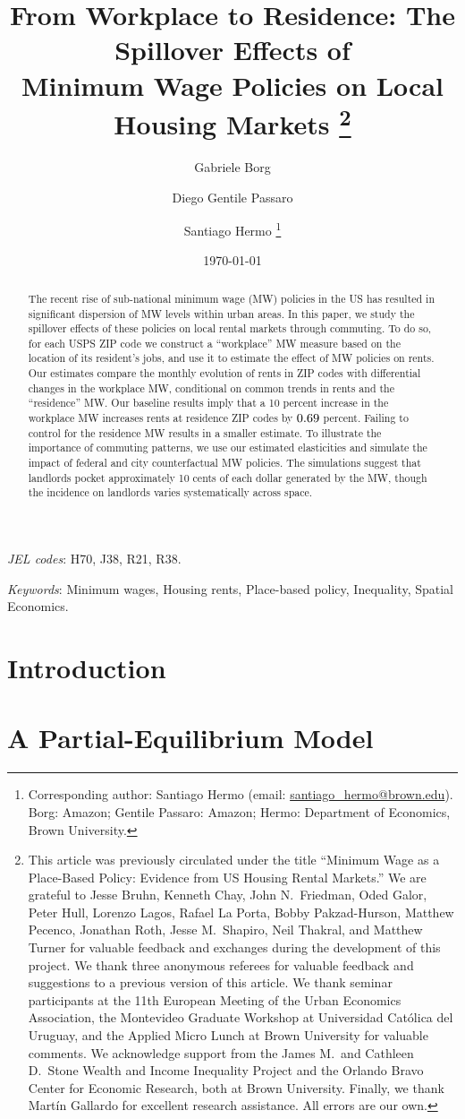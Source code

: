 \documentclass{article}
\title{ From Workplace to Residence: The Spillover Effects of \\
        Minimum Wage Policies on Local Housing Markets%
        \thanks{This article was previously circulated under the title
        ``Minimum Wage as a Place-Based Policy: Evidence from US Housing Rental 
        Markets.''
        We are grateful to Jesse Bruhn, Kenneth Chay, John N.\ Friedman, 
        Oded Galor, Peter Hull, Lorenzo Lagos, Rafael La Porta, Bobby Pakzad-Hurson, 
        Matthew Pecenco, Jonathan Roth, Jesse M.\ Shapiro, Neil Thakral, 
        and Matthew Turner for valuable feedback and exchanges during the 
        development of this project.
        We thank three anonymous referees for valuable feedback and suggestions
        to a previous version of this article.
        We thank seminar participants at 
        the 11th European Meeting of the Urban Economics Association, 
        the Montevideo Graduate Workshop at Universidad Católica del Uruguay, and
        the Applied Micro Lunch at Brown University for valuable comments.
        We acknowledge support from 
        the James M.\ and Cathleen D.\ Stone Wealth and Income Inequality Project and 
        the Orlando Bravo Center for Economic Research, both at Brown University.
        Finally, we thank Martín Gallardo for excellent research assistance.
        All errors are our own.}}
\author{Gabriele Borg \and Diego Gentile Passaro \and Santiago Hermo%
        \footnote{Corresponding author: Santiago Hermo (email: \url{santiago_hermo@brown.edu}).
        Borg: Amazon;
        Gentile Passaro: Amazon;
        Hermo: Department of Economics, Brown University.}}
\date{\today}
\begin{document}

\maketitle

\begin{abstract}
    \noindent
    The recent rise of sub-national minimum wage (MW) policies in the US has 
    resulted in significant dispersion of MW levels within urban areas.
    In this paper, we study the spillover effects of these policies on local
    rental markets through commuting.
    To do so, for each USPS ZIP code we construct a ``workplace'' MW measure 
    based on the location of its resident's jobs, and use it to estimate the 
    effect of MW policies on rents.
    Our estimates compare the monthly evolution of rents in ZIP codes with 
    differential changes in the workplace MW, conditional on common trends 
    in rents and the ``residence'' MW.
    Our baseline results imply that a 10 percent increase in the workplace MW 
    increases rents at residence ZIP codes by $0.69$ percent.
    Failing to control for the residence MW results in a smaller estimate.
    To illustrate the importance of commuting patterns, we use our estimated 
    elasticities and simulate the impact of federal and city counterfactual 
    MW policies.
    The simulations suggest that landlords pocket approximately 10 cents of each 
    dollar generated by the MW, though the incidence on landlords varies 
    systematically across space.
\end{abstract}

\noindent \textit{JEL codes}: H70, J38, R21, R38.

\noindent \textit{Keywords}: Minimum wages, Housing rents, Place-based policy, Inequality, Spatial Economics.


\clearpage


\section{Introduction}\label{sec:intro}
    

\section{A Partial-Equilibrium Model}\label{sec:model}
    
\end{document}
